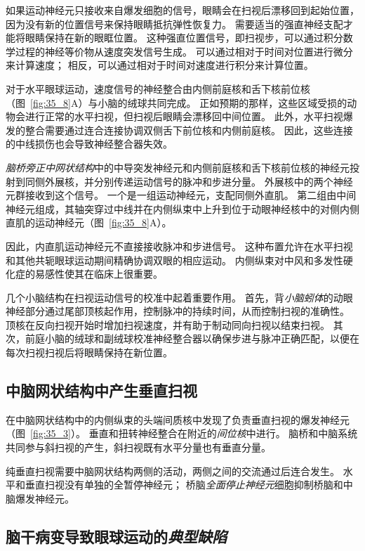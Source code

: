 如果运动神经元只接收来自爆发细胞的信号，眼睛会在扫视后漂移回到起始位置，因为没有新的位置信号来保持眼睛抵抗弹性恢复力。
需要适当的强直神经支配才能将眼睛保持在新的眼眶位置。
这种强直位置信号，即扫视步，可以通过积分数学过程的神经等价物从速度突发信号生成。
可以通过相对于时间对位置进行微分来计算速度；
相反，可以通过相对于时间对速度进行积分来计算位置。


对于水平眼球运动，速度信号的神经整合由内侧前庭核和舌下核前位核（图~\ref{fig:35_8}A）与小脑的绒球共同完成。
正如预期的那样，这些区域受损的动物会进行正常的水平扫视，但扫视后眼睛会漂移回中间位置。
此外，水平扫视爆发的整合需要通过连合连接协调双侧舌下前位核和内侧前庭核。
因此，这些连接的中线损伤也会导致神经整合器失效。


\textit{脑桥旁正中网状结构}中的中导突发神经元和内侧前庭核和舌下核前位核的神经元投射到同侧外展核，并分别传递运动信号的脉冲和步进分量。
外展核中的两个神经元群接收到这个信号。
一个是一组运动神经元，支配同侧外直肌。
第二组由中间神经元组成，其轴突穿过中线并在内侧纵束中上升到位于动眼神经核中的对侧内侧直肌的运动神经元（图~\ref{fig:35_8}A）。


因此，内直肌运动神经元不直接接收脉冲和步进信号。
这种布置允许在水平扫视和其他共轭眼球运动期间精确协调双眼的相应运动。
内侧纵束对中风和多发性硬化症的易感性使其在临床上很重要。


几个小脑结构在扫视运动信号的校准中起着重要作用。
首先，背\textit{小脑蚓体}的动眼神经部分通过尾部顶核起作用，控制脉冲的持续时间，从而控制扫视的准确性。
顶核在反向扫视开始时增加扫视速度，并有助于制动同向扫视以结束扫视。
其次，前庭小脑的绒球和副绒球校准神经整合器以确保步进与脉冲正确匹配，以便在每次扫视扫视后将眼睛保持在新位置。



\subsection{中脑网状结构中产生垂直扫视}

在中脑网状结构中的内侧纵束的头端间质核中发现了负责垂直扫视的爆发神经元（图~\ref{fig:35_3}）。
垂直和扭转神经整合在附近的\textit{间位核}中进行。
脑桥和中脑系统共同参与斜扫视的产生，斜扫视既有水平分量也有垂直分量。


纯垂直扫视需要中脑网状结构两侧的活动，两侧之间的交流通过后连合发生。
水平和垂直扫视没有单独的全暂停神经元；
桥脑\textit{全面停止神经元}细胞抑制桥脑和中脑爆发神经元。



\subsection{脑干病变导致眼球运动的\textit{典型缺陷}}

